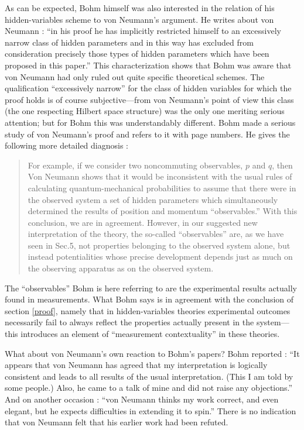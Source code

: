 \documentclass[11pt]{article}
\begin{document}
As can be expected, Bohm himself was also interested in the relation of his hidden-variables scheme to von Neumann's argument. He writes about von Neumann \cite[p.\@ 187]{bohm}: ``in his proof he has implicitly restricted himself to an excessively narrow class of hidden parameters and in this way has excluded from consideration precisely those types of hidden parameters which have been proposed in this paper.'' This characterization shows that Bohm was aware that von Neumann had only ruled out quite specific theoretical schemes. The qualification ``excessively narrow'' for the class of hidden variables for which the proof holds is of course subjective---from von Neumann's point of view this class (the one respecting Hilbert space structure) was the only one meriting serious attention; but for Bohm this was understandably different. Bohm made a serious study of von Neumann's proof and refers to it with page numbers. He gives the following more detailed diagnosis \cite[p.\@  187, see also note 9 on p.\@ 167]{bohm}:
\begin{quote}
  For example, if we consider two noncommuting observables, $p$ and $q$, then Von Neumann shows that it would be inconsistent with the usual rules of calculating quantum-mechanical probabilities to assume that there were in the observed system a set of hidden parameters which simultaneously determined the results of position and momentum ``observables.'' With this conclusion, we are in agreement. However, in our suggested new interpretation of the theory, the so-called ``observables'' are, as we have seen in Sec.\@5, not properties belonging to the observed system alone, but instead potentialities whose precise development depends just as much on the observing apparatus as on the observed system.
\end{quote}
The ``observables'' Bohm is here referring to are the experimental results actually found in measurements. What Bohm says is in agreement with the  conclusion of section \ref{proof}, namely that in hidden-variables theories experimental outcomes necessarily fail to always reflect the properties actually present in the system---this introduces an element of ``measurement contextuality'' in these theories.

What about von Neumann's own reaction to Bohm's papers? Bohm reported \cite{stoltzner}: ``It appears that von Neumann has agreed that my interpretation is logically consistent and leads to all results of the usual interpretation. (This I am told by some people.) Also, he came to a talk of mine and did not raise any objections.'' And on another occasion \cite[p.\@ 47]{freire}: ``von Neumann thinks my work correct, and even elegant, but he expects difficulties in extending it to spin.'' There is no indication that von Neumann felt that his earlier work had been refuted.
\end{document}
